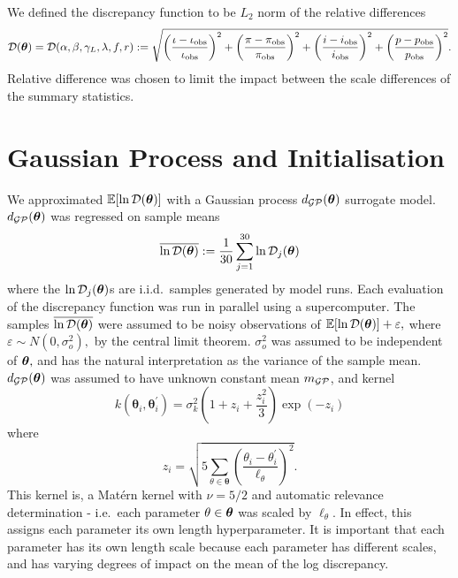 We defined the discrepancy function to be $L_2$ norm of the relative
differences
$$
    \mathcal{D}(\bm{\theta}) = \mathcal{D}(\alpha, \beta, \gamma_L, \lambda, f, r)
    := \sqrt{
        \left(\frac{\iota - \iota_\text{obs}}{\iota_\text{obs}}\right)^2
        + \left(\frac{\pi - \pi_\text{obs}}{\pi_\text{obs}}\right)^2
        + \left(\frac{i - i_\text{obs}}{i_\text{obs}}\right)^2
        + \left(\frac{p - p_\text{obs}}{p_\text{obs}}\right)^2
    }.
$$
Relative difference was chosen to limit the impact between the scale
differences of the summary statistics.

\section{Gaussian Process and Initialisation}

We approximated $\operatorname{\mathbb{E}}[\ln\mathcal{D}(\bm{\theta})]$ with
a Gaussian process $d_{\mathcal{GP}}(\bm{\theta})$ surrogate model.
$d_{\mathcal{GP}}(\bm{\theta})$ was regressed on sample means
$$
    \overline{\ln\mathcal{D}(\bm{\theta})} := \frac{1}{30}\sum_{j = 1}^{30} \ln\mathcal{D}_j(\bm{\theta})
$$
where the $\ln\mathcal{D}_j(\bm{\theta})$s are i.i.d.\ samples generated by model runs.
Each evaluation of the discrepancy function was run in parallel 
using a supercomputer.
The samples
$\overline{\ln\mathcal{D}(\bm{\theta})}$ were assumed to be noisy observations of
$\operatorname{\mathbb{E}}[\ln\mathcal{D}(\bm{\theta})] + \varepsilon,$ where
$\varepsilon \sim N(0, \sigma_o^2),$ by the central limit theorem.
$\sigma_o^2$ was assumed to be independent of $\bm{\theta},$ and has the natural
interpretation as the variance of the sample mean.
$d_{\mathcal{GP}}(\bm{\theta})$ was assumed to have unknown constant mean $m_{\mathcal{GP}}$, and kernel
$$
    k(\bm{\theta}_i, \bm{\theta}_i^\prime)
    = \sigma_k^2 (1 + z_i + \frac{z_i^2}{3})\exp(-z_i)
$$
where
$$
    z_i = \sqrt{
        5 \sum_{\theta\in \bm{\theta}}\left(
        \frac{\theta_i - \theta_i^\prime}{\ell_\theta}
        \right)^2
    }.
$$
This kernel is, a Mat\'ern kernel with $\nu = 5/2$ and automatic
relevance determination - i.e.\ each parameter $\theta\in\bm{\theta}$ was
scaled by $\ell_\theta.$ In effect, this assigns each parameter its own
length hyperparameter. It is important that each parameter has its own length
scale because each parameter has different scales, and has varying degrees of
impact on the mean of the log discrepancy.

